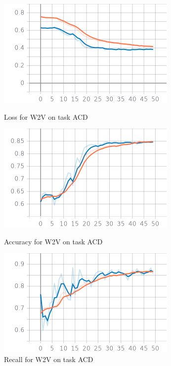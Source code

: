 \documentclass{article}
\begin{document}
                \begin{figure}[!htb]
                \begin{minipage}{0.48\textwidth}
                    \centering
                    \includegraphics[width=.7\linewidth]{w2v_acd_epoch_loss.png}
                    \caption{Loss for W2V on task ACD}\label{Fig:Data7}
                \end{minipage}\hfill
                \begin{minipage}{0.48\textwidth}
                    \centering
                    \includegraphics[width=.7\linewidth]{w2v_acd_epoch_accuracy.png}
                    \caption{Accuracy for W2V on task ACD}\label{Fig:Data8}
                \end{minipage}
                \begin{minipage}{0.48\textwidth}
                    \centering
                    \includegraphics[width=.7\linewidth]{w2v_acd_epoch_recall.png}
                    \caption{Recall for W2V on task ACD}\label{Fig:Data9}
                \end{minipage}
            \end{figure}
\end{document}
